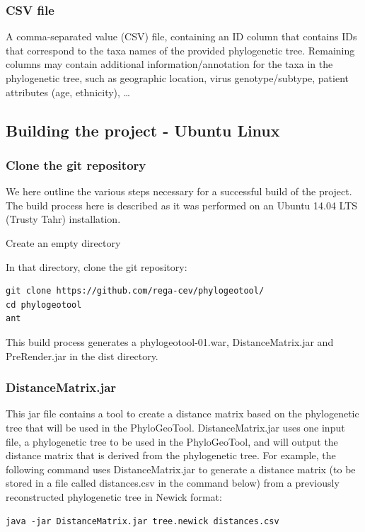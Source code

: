 \documentclass[a4paper, 11pt]{article} %
\begin{document}
\subsubsection*{CSV file}
A comma-separated value (CSV) file, containing an ID column that contains IDs that correspond to the taxa names of the provided phylogenetic tree.
Remaining columns may contain additional information/annotation for the taxa in the phylogenetic tree, such as geographic location, virus genotype/subtype, patient attributes (age, ethnicity), \ldots

\subsection{Building the project - Ubuntu Linux}

\subsubsection{Clone the git repository}

We here outline the various steps necessary for a successful build of the project.
The build process here is described as it was performed on an Ubuntu 14.04 LTS (Trusty Tahr) installation.
\begin{itemize}
\item Create an empty directory
\item {In that directory, clone the git repository: 
\begin{verbatim}
git clone https://github.com/rega-cev/phylogeotool/
cd phylogeotool
ant
\end{verbatim}
\item This build process generates a phylogeotool-01.war, DistanceMatrix.jar and PreRender.jar in the dist directory.
}
\end{itemize}

\subsubsection{DistanceMatrix.jar}
This jar file contains a tool to create a distance matrix based on the phylogenetic tree that will be used in the PhyloGeoTool.
DistanceMatrix.jar uses one input file, a phylogenetic tree to be used in the PhyloGeoTool, and will output the distance matrix that is derived from the phylogenetic tree. %
For example, the following command uses DistanceMatrix.jar to generate a distance matrix (to be stored in a file called distances.csv in the command below) from a previously reconstructed phylogenetic tree in Newick format: 
\begin{verbatim}
java -jar DistanceMatrix.jar tree.newick distances.csv
\end{verbatim}
\end{document}
